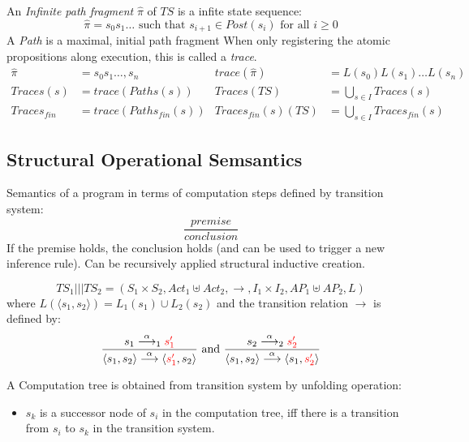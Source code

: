 \documentclass[a4paper, 10pt]{article}
\begin{document}
\begin{mdframed}
An \emph{Infinite path fragment} $\hat{\pi}$ of $TS$ is a infite state sequence:
\[ \hat{\pi} = s_0s_1\dots \text{ such that } s_{i+1}\in Post(s_i) \text{ for all } i\geq 0 \]
A \emph{Path} is a maximal, initial path fragment
When only registering the atomic propositions along execution, this is called a \emph{trace}.
\begin{align*}
\hat{\pi}&=s_0s_1\dots,s_n &
trace(\hat{\pi})&=L(s_0)L(s_1)\dots L(s_n)
\\
Traces(s) &= trace(Paths(s)) &
Traces(TS) &= \bigcup_{s\in I} Traces(s)
\\
Traces_{fin} &= trace(Paths_{fin}(s)) &
Traces_{fin}(s)(TS) &= \bigcup_{s\in I} Traces_{fin}(s)
\end{align*}
\end{mdframed}

\subsection{Structural Operational Semsantics}

Semantics of a program in terms of computation steps defined by transition system: \[ \frac{premise}{conclusion} \]
If the premise holds, the conclusion holds (and can be used to trigger a new inference rule).
Can be recursively applied \follows structural inductive creation.

\begin{mdframed}[roundcorner=5pt,
subtitlebelowline=false,subtitleaboveline=false,
subtitlebackgroundcolor=blue!30,
frametitlerule=true,
frametitlebackgroundcolor=blue!30,
frametitle={Interleaving}
]
\[ TS_1 ||| TS_2 = (S_1\times S_2, Act_1 \uplus Act_2,\longrightarrow, I_1\times I_2, AP_1\uplus AP_2, L) \]
    where $L(\langle s_1,s_2\rangle) = L_1(s_1) \cup L_2(s_2)$ and the transition relation $\longrightarrow$ is defined by:
    \begin{align*}
    \frac{s_1\overset{\alpha}{\longrightarrow}_1 \textcolor{red}{s'_1}}
    {\langle s_1,s_2\rangle\overset{\alpha}{\longrightarrow}\langle \textcolor{red}{s'_1},s_2\rangle}
    \text{ and }
    \frac{s_2\overset{\alpha}{\longrightarrow}_2 \textcolor{red}{s'_2}}
    {\langle s_1,s_2\rangle\overset{\alpha}{\longrightarrow}\langle s_1,\textcolor{red}{s'_2}\rangle}
    \end{align*}
\end{mdframed}

A Computation tree is obtained from transition system by unfolding operation:
\begin{itemize}
    \item $s_k$ is a successor node of $s_i$ in the computation tree, iff there is a transition from $s_i$ to $s_k$ in the transition system.
\end{itemize}
\end{document}

